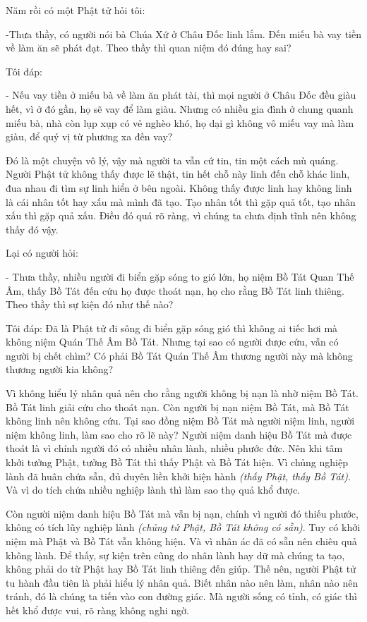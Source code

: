 \documentclass[
  12pt,
  oneside]{book}
\begin{document}
Năm rồi có một Phật tử hỏi tôi:

-Thưa thầy, có người nói bà Chúa Xứ ở Châu Đốc linh lắm. Đến miếu bà vay tiền về làm ăn sẽ phát đạt. Theo thầy thì quan niệm đó đúng hay sai?

Tôi đáp:

- Nếu vay tiền ở miếu bà về làm ăn phát tài, thì mọi người ở Châu Đốc đều giàu hết, vì ở đó gần, họ sẽ vay để làm giàu. Nhưng có nhiều gia đình ở chung quanh miếu bà, nhà còn lụp xụp có vẻ nghèo khó, họ dại gì không vô miếu vay mà làm giàu, để quý vị từ phương xa đến vay?

Đó là một chuyện vô lý, vậy mà người ta vẫn cứ tin, tin một cách mù quáng. Người Phật tử không thấy được lẽ thật, tin hết chỗ này linh đến chỗ khác linh, đua nhau đi tìm sự linh hiển ở bên ngoài. Không thấy được linh hay không linh là cái nhân tốt hay xấu mà mình đã tạo. Tạo nhân tốt thì gặp quả tốt, tạo nhân xấu thì gặp quả xấu. Điều đó quá rõ ràng, vì chúng ta chưa định tĩnh nên không thấy đó vậy.

Lại có người hỏi:

- Thưa thầy, nhiều người đi biển gặp sóng to gió lớn, họ niệm Bồ Tát Quan Thế Âm, thấy Bồ Tát đến cứu họ được thoát nạn, họ cho rằng Bồ Tát linh thiêng. Theo thầy thì sự kiện đó như thế nào?

Tôi đáp: Đã là Phật tử đi sông đi biển gặp sóng gió thì không ai tiếc hơi mà không niệm Quán Thế Âm Bồ Tát. Nhưng tại sao có người được cứu, vẫn có người bị chết chìm? Có phải Bồ Tát Quán Thế Âm thương người này mà không thương người kia không?

Vì không hiểu lý nhân quả nên cho rằng người không bị nạn là nhờ niệm Bồ Tát. Bồ Tát linh giải cứu cho thoát nạn. Còn người bị nạn niệm Bồ Tát, mà Bồ Tát không linh nên không cứu. Tại sao đồng niệm Bồ Tát mà người niệm linh, người niệm không linh, làm sao cho rõ lẽ này? Người niệm danh hiệu Bồ Tát mà được thoát là vì chính người đó có nhiều nhân lành, nhiều phước đức. Nên khi tâm khởi tưởng Phật, tưởng Bồ Tát thì thấy Phật và Bồ Tát hiện. Vì chủng nghiệp lành đã huân chứa sẵn, đủ duyên liền khởi hiện hành \emph{(thấy Phật, thấy Bồ Tát)}. Và vì do tích chứa nhiều nghiệp lành thì làm sao thọ quả khổ được.

Còn người niệm danh hiệu Bồ Tát mà vẫn bị nạn, chính vì người đó thiếu phước, không có tích lũy nghiệp lành \emph{(chủng tử Phật, Bồ Tát không có sẵn)}. Tuy có khởi niệm mà Phật và Bồ Tát vẫn không hiện. Và vì nhân ác đã có sẵn nên chiêu quả không lành. Để thấy, sự kiện trên cũng do nhân lành hay dữ mà chúng ta tạo, không phải do từ Phật hay Bồ Tát linh thiêng đến giúp. Thế nên, người Phật tử tu hành đầu tiên là phải hiểu lý nhân quả. Biết nhân nào nên làm, nhân nào nên tránh, đó là chúng ta tiến vào con đường giác. Mà người sống có tỉnh, có giác thì hết khổ được vui, rõ ràng không nghi ngờ.
\end{document}

